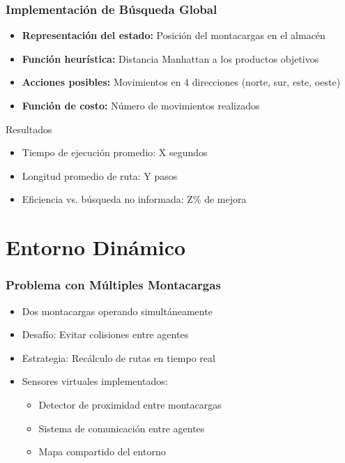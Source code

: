 \documentclass[aspectratio=169]{beamer}
\begin{document}
\begin{frame}
    \frametitle{Implementación de Búsqueda Global}
    \begin{itemize}
        \item \textbf{Representación del estado:} Posición del montacargas en el almacén
        \item \textbf{Función heurística:} Distancia Manhattan a los productos objetivos
        \item \textbf{Acciones posibles:} Movimientos en 4 direcciones (norte, sur, este, oeste)
        \item \textbf{Función de costo:} Número de movimientos realizados
    \end{itemize}
    
    \vspace{0.5cm}
    \begin{block}{Resultados}
        \begin{itemize}
            \item Tiempo de ejecución promedio: X segundos
            \item Longitud promedio de ruta: Y pasos
            \item Eficiencia vs. búsqueda no informada: Z\% de mejora
        \end{itemize}
    \end{block}
\end{frame}

\section{Entorno Dinámico}

\begin{frame}
    \frametitle{Problema con Múltiples Montacargas}
    \begin{itemize}
        \item Dos montacargas operando simultáneamente
        \item Desafío: Evitar colisiones entre agentes
        \item Estrategia: Recálculo de rutas en tiempo real
        \item Sensores virtuales implementados:
        \begin{itemize}
            \item Detector de proximidad entre montacargas
            \item Sistema de comunicación entre agentes
            \item Mapa compartido del entorno
        \end{itemize}
    \end{itemize}
\end{frame}
\end{document}
